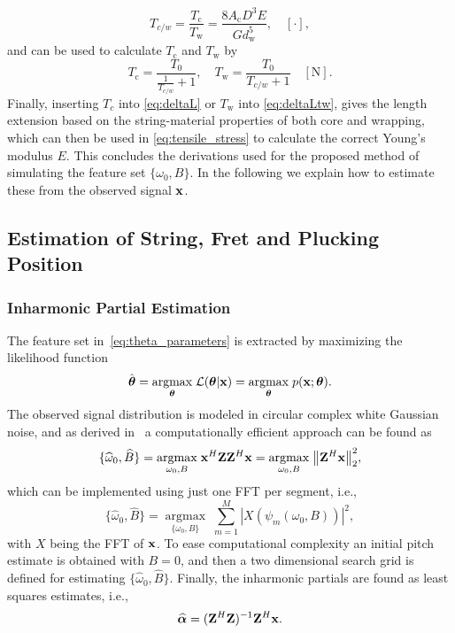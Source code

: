 \documentclass{article}
\begin{document}
\begin{sloppy}
\begin{equation}
    T_{c/w} = \frac{T_\text{c}}{T_\text{w}} = \frac{8A_\text{c}D^3E}{Gd_\text{w}^5},  \quad [\cdot],
\end{equation}
%
and can be used to calculate $T_\text{c}$ and $T_\text{w}$ by
%
\begin{equation}\label{eq:Tc_derived}
    T_\text{c} = \frac{T_0}{\frac{1}{T_{c/w}}+1}, \quad T_\text{w} = \frac{T_0}{T_{c/w}+1}\quad [\text{N}].
\end{equation}
%
Finally, inserting $T_c$ into \eqref{eq:deltaL} or $T_\text{w}$ into \eqref{eq:deltaLtw}, gives the length extension based on the string-material properties of both core and wrapping, which can then be used in \eqref{eq:tensile_stress} to calculate the correct Young's modulus $E$. This concludes the derivations used for the proposed method of simulating the feature set $\{\omega_0, B\}$. In the following we explain how to estimate these from the observed signal $\mathbf x$.

\subsection{Estimation of String, Fret and Plucking Position}
\subsubsection{Inharmonic Partial Estimation}
The feature set in~\eqref{eq:theta_parameters} is extracted by maximizing the likelihood function %
\begin{equation}
    \hat{\boldsymbol\theta} = \underset{\text{\boldmath$\theta$}}{\operatorname{argmax}}\;{\mathcal{L}(\text{\boldmath$\theta$} | \mathbf x)} = \underset{\text{\boldmath$\theta$}}{\operatorname{argmax}}\;{p(\mathbf x ; \text{\boldmath$\theta$})}.
\end{equation}
The observed signal distribution is modeled in circular complex white Gaussian noise, and as derived in~\cite{hjerrild::icassp19} a computationally efficient approach can be found as
\begin{equation} \label{eq:ANLS}
    \{\widehat\omega_0, \widehat B \} = \underset{\omega_0,B}{\operatorname{argmax}}\;{\mathbf x^H \mathbf{Z} \mathbf{Z}^H \mathbf x} = \underset{\omega_0,B}{\operatorname{argmax}}\;{ \left\lVert\mathbf{Z}^H\mathbf x\right\rVert_2^2},
\end{equation}
which can be implemented using just one FFT per segment, i.e.,
\begin{equation}
    	\{\widehat\omega_0,\widehat B  \} = \underset{\{\omega_0, B  \}}{\operatorname{argmax}}\; \sum_{m=1}^{M} |X(\psi_m(\omega_0,B))|^2, 
\end{equation}
with $X$ being the FFT of $\mathbf x$. To ease computational complexity an initial pitch estimate is obtained with $B=0$, and then a two dimensional search grid is defined for estimating  $\{\widehat\omega_0, \widehat B \}$. %
 Finally, the inharmonic partials are found as least squares estimates, i.e.,
\begin{equation}\label{eq:alphahat}
  \text{\boldmath${\widehat\alpha}$} = (\mathbf{Z}^H\mathbf{Z})^{-1}\mathbf{Z}^H\mathbf x.
\end{equation}

\end{sloppy}
\end{document}
